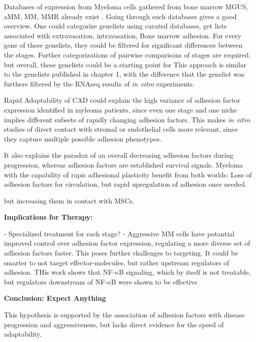 Databases of expression from Myeloma cells gathered from bone
marrow \ac{MGUS}, \ac{aMM}, \ac{MM}, \ac{MMR} already exist
\citet{akhmetzyanovaDynamicCD138Surface2020,
      seckingerCD38ImmunotherapeuticTarget2018}. Going through such databases gives a
good overview. One could categorize genelists using curated databases, get lists
associated with extravasation, intravasation, Bone marrow adhesion. For every
gene of these genelists, they could be filtered for significant differences
between the stages. Further categorizations of pairwise comparisons of stages
are required. but overall, these genelists could be a starting point for This
approach is similar to the genelists published in chapter 1, with the difference
that the genelist was furthere filtered by the RNAseq results of \textit{in
      vitro} experiments.


Rapid Adaptability of \ac{CAD} could explain the high variance of adhesion
factor expression identified in myleoma patients, since even one stage and one
niche implies different subsets of rapidly changing adhesion factors. This makes
\textit{in vitro} studies of direct contact with stromal or endothelial cells
more relevant, since they capture multiple possible adhesion phenotypes.

It also explains the paradox of an overall decreasing adhesion factors during
progression, whereas adhesion factors are established survival signals. Myeloma
with the capability of rapis adhesional plasticity benefit from both worlds:
Loss of adhesion factors for circulation, but rapid upregulation of adhesion
once needed.

but increasing them in contact with \acp{MSC}.


\textbf{Implications for Therapy:}

- Specialized treatment for each stage?
- Aggressive MM cells have potantial improved control over adhesion factor
expression, regulating a more diverse set of adhesion factors faster. This poses
further challenges to targeting. It could be smarter to not target
effector-molecules, but rather upstream regulators of adhesion. THis work shows
that NF-$\kappa$B signaling, which by itself is not treatable, but regulators
downstream of NF-$\kappa$B were shown to be effective
\cite{adamikEZH2HDAC1Inhibition2017, adamikXRK3F2InhibitionP62ZZ2018}


\textbf{Conclusion: Expect Anything}




This hypothesis is supported by the association of adhesion
factors with disease progression and aggressiveness, but lacks direct evidence
for the speed of adaptability.



